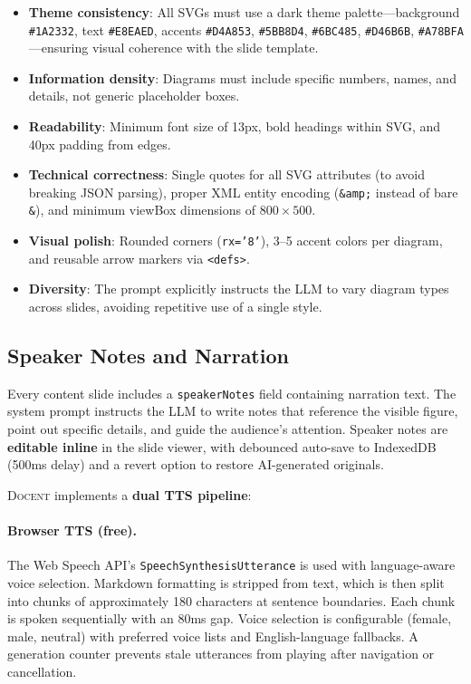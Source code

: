 \documentclass[11pt,a4paper]{article}
\newcommand{\system}{\textsc{Docent}\xspace}
\begin{document}
\begin{itemize}[leftmargin=*,nosep]
    \item \textbf{Theme consistency}: All SVGs must use a dark theme palette---background \texttt{\#1A2332}, text \texttt{\#E8EAED}, accents \texttt{\#D4A853}, \texttt{\#5BB8D4}, \texttt{\#6BC485}, \texttt{\#D46B6B}, \texttt{\#A78BFA}---ensuring visual coherence with the slide template.
    \item \textbf{Information density}: Diagrams must include specific numbers, names, and details, not generic placeholder boxes.
    \item \textbf{Readability}: Minimum font size of 13px, bold headings within SVG, and 40px padding from edges.
    \item \textbf{Technical correctness}: Single quotes for all SVG attributes (to avoid breaking JSON parsing), proper XML entity encoding (\texttt{\&amp;} instead of bare \texttt{\&}), and minimum viewBox dimensions of $800 \times 500$.
    \item \textbf{Visual polish}: Rounded corners (\texttt{rx='8'}), 3--5 accent colors per diagram, and reusable arrow markers via \texttt{<defs>}.
    \item \textbf{Diversity}: The prompt explicitly instructs the LLM to vary diagram types across slides, avoiding repetitive use of a single style.
\end{itemize}

\subsection{Speaker Notes and Narration}
\label{sec:narration}

Every content slide includes a \texttt{speakerNotes} field containing narration text.
The system prompt instructs the LLM to write notes that reference the visible figure, point out specific details, and guide the audience's attention.
Speaker notes are \textbf{editable inline} in the slide viewer, with debounced auto-save to IndexedDB (500ms delay) and a revert option to restore AI-generated originals.

\system implements a \textbf{dual TTS pipeline}:

\paragraph{Browser TTS (free).}
The Web Speech API's \texttt{SpeechSynthesisUtterance} is used with language-aware voice selection.
Markdown formatting is stripped from text, which is then split into chunks of approximately 180 characters at sentence boundaries.
Each chunk is spoken sequentially with an 80ms gap.
Voice selection is configurable (female, male, neutral) with preferred voice lists and English-language fallbacks.
A generation counter prevents stale utterances from playing after navigation or cancellation.
\end{document}
